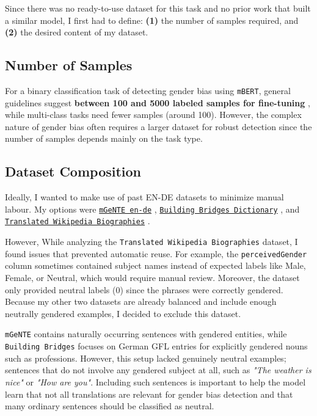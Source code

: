 Since there was no ready-to-use dataset for this task and no prior work that built a similar model, I first had to define: \textbf{(1)} the number of samples required,  and \textbf{(2)} the desired content of my dataset.

\subsection{Number of Samples}
For a binary classification task of detecting gender bias using \texttt{mBERT}, general guidelines suggest \textbf{between 100 and 5000 labeled samples for fine-tuning} \citep{pecherComparingSpecialisedSmall2024}, while multi-class tasks need fewer samples (around 100). However, the complex nature of gender bias often requires a larger dataset for robust detection since the number of samples depends mainly on the task type. 

\subsection{Dataset Composition}
Ideally, I wanted to make use of past EN-DE datasets to minimize manual labour. My options were \texttt{\href{https://huggingface.co/datasets/FBK-MT/mGeNTE}{mGeNTE en-de}} \citep{savoldiMGeNTEMultilingualResource2025}, \texttt{\href{https://github.com/g8a9/building-bridges-gender-fair-german-mt}{Building Bridges Dictionary}} \citep{lardelliBuildingBridgesDataset2024}, and \texttt{\href{https://research.google/blog/a-dataset-for-studying-gender-bias-in-translation/}{Translated Wikipedia Biographies}} \citep{stellaDatasetStudyingGender2021}. 

However, While analyzing the \texttt{Translated Wikipedia Biographies} dataset, I found issues that prevented automatic reuse. For example, the \texttt{perceivedGender} column sometimes contained subject names instead of expected labels like Male, Female, or Neutral, which would require manual review. Moreover, the dataset only provided neutral labels (0) since the phrases were correctly gendered. Because my other two datasets are already balanced and include enough neutrally gendered examples, I decided to exclude this dataset.

\texttt{mGeNTE} contains naturally occurring sentences with gendered entities, while \texttt{Building Bridges} focuses on German GFL entries for explicitly gendered nouns such as professions. However, this setup lacked genuinely neutral examples; sentences that do not involve any gendered subject at all, such as \textit{"The weather is nice"} or \textit{"How are you"}. Including such sentences is important to help the model learn that not all translations are relevant for gender bias detection and that many ordinary sentences should be classified as neutral.

